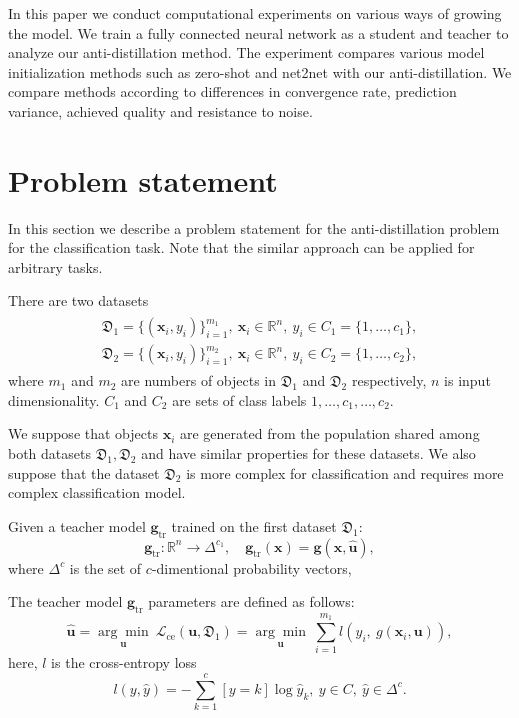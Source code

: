 \documentclass[conference]{IEEEtran}
\begin{document}
In this paper we conduct computational experiments on various ways of growing the model. We train a fully connected neural network as a student and teacher to analyze our anti-distillation method. The experiment compares various model initialization methods such as zero-shot and net2net with our anti-distillation. We compare methods according to differences in convergence rate, prediction variance, achieved quality and resistance to noise.

\section{Problem statement}
In this section we describe a problem statement for the anti-distillation problem for the classification task. Note that the similar approach can be applied for arbitrary tasks.

There are two datasets
\begin{gather*}
\begin{aligned}
    \mathfrak{D}_1 = \{(\mathbf{x}_i, y_i)\}_{i=1}^{m_1},~\mathbf{x}_i \in \mathbb{R}^{n},~y_i \in C_1 = \{1, \dots, c_1\}, \\
    \mathfrak{D}_2 =  \{(\mathbf{x}_i, y_i)\}_{i=1}^{m_2},~\mathbf{x}_i \in \mathbb{R}^{n},~y_i \in C_2 = \{1, \dots, c_2\},
\end{aligned}
\end{gather*}
where $m_1$ and $m_2$ are numbers of objects in $\mathfrak{D}_1$ and $\mathfrak{D}_2$ respectively, $n$ is input dimensionality. $C_1$ and $C_2$ are sets of class labels $1, \dots, c_1, \dots, c_2$.

We suppose that objects $\mathbf{x}_i$ are generated from the population shared among both datasets $\mathfrak{D}_1, \mathfrak{D}_2$ and have similar properties for these datasets. We also suppose that the dataset $\mathfrak{D}_2$ is more complex for classification and requires more complex classification model.

Given a teacher model $\mathbf{g}_\text{tr}$ trained on the first dataset $\mathfrak{D}_1$:
\[\mathbf{g}_\text{tr}: \mathbb{R}^{n} \rightarrow \Delta^{c_1},\quad \mathbf{g}_\text{tr}(\mathbf{x}) = \mathbf{g}(\mathbf{x}, \hat{\mathbf{u}}),\] 
where $\Delta^c$ is the set of $c$-dimentional probability vectors,

The  teacher model $\mathbf{g}_\text{tr}$ parameters are defined as follows:
$$\hat{\mathbf{u}} =  \underset{\mathbf{u}}{\arg\min}~\mathcal{L}_\text{ce}(\mathbf{u}, \mathfrak{D}_1) =\underset{\mathbf{u}}{\arg\min}~\sum\limits_{i=1}^{m_1} l \left(y_i,~g(\mathbf{x}_i, \mathbf{u})\right),$$
here, $l$ is the cross-entropy loss 
$$l(y, \hat{y}) = -\sum\limits_{k=1}^{c} [y = k] \log{\hat{y}_k},~y \in C,~\hat{y} \in \Delta^c.$$
\end{document}

